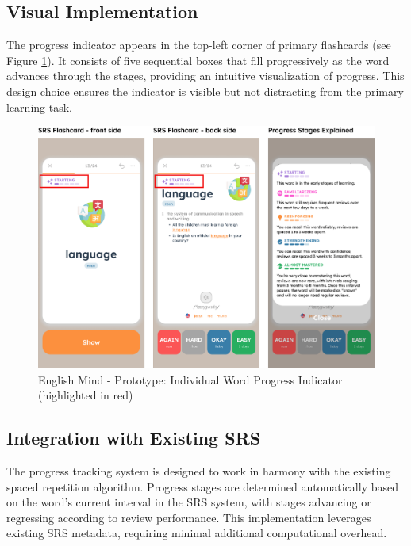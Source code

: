 \subsection*{Visual Implementation}

The progress indicator appears in the top-left corner of primary flashcards (see Figure \ref{fig:em-prototype-word-progress}). It consists of five sequential boxes that fill progressively as the word advances through the stages, providing an intuitive visualization of progress. This design choice ensures the indicator is visible but not distracting from the primary learning task.

\begin{figure}[!h]
    \includegraphics[width=1\textwidth]{src/figures/em-prototype-progress-system.png}
    \caption{English Mind - Prototype: Individual Word Progress Indicator (highlighted in red)}
    \label{fig:em-prototype-word-progress}
\end{figure}

\subsection*{Integration with Existing SRS}

The progress tracking system is designed to work in harmony with the existing spaced repetition algorithm. Progress stages are determined automatically based on the word's current interval in the SRS system, with stages advancing or regressing according to review performance. This implementation leverages existing SRS metadata, requiring minimal additional computational overhead.

